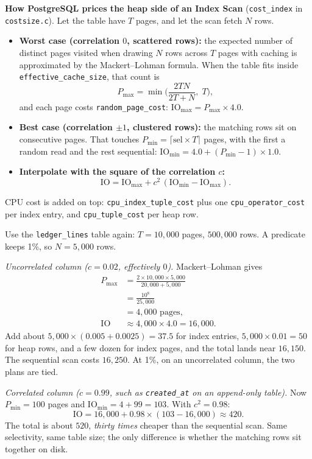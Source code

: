 \begin{formalbox}
\textbf{How PostgreSQL prices the heap side of an Index Scan} (\texttt{cost\_index} in \texttt{costsize.c}). Let the table have $T$ pages, and let the scan fetch $N$ rows.
\begin{itemize}
  \item \textbf{Worst case (correlation $0$, scattered rows):} the expected number of distinct pages visited when drawing $N$ rows across $T$ pages with caching is approximated by the Mackert--Lohman formula. When the table fits inside \texttt{effective\_cache\_size}, that count is
  \[
    P_{\max} = \min\!\Big(\frac{2TN}{2T + N},\; T\Big),
  \]
  and each page costs \texttt{random\_page\_cost}: $\text{IO}_{\max} = P_{\max} \times 4.0$.
  \item \textbf{Best case (correlation $\pm 1$, clustered rows):} the matching rows sit on consecutive pages. That touches $P_{\min} = \lceil \text{sel} \times T \rceil$ pages, with the first a random read and the rest sequential: $\text{IO}_{\min} = 4.0 + (P_{\min} - 1) \times 1.0$.
  \item \textbf{Interpolate with the square of the correlation $c$:}
  \[
    \text{IO} = \text{IO}_{\max} + c^2\,(\text{IO}_{\min} - \text{IO}_{\max}).
  \]
\end{itemize}
CPU cost is added on top: \texttt{cpu\_index\_tuple\_cost} plus one \texttt{cpu\_operator\_cost} per index entry, and \texttt{cpu\_tuple\_cost} per heap row.
\end{formalbox}

\begin{example}
\label{ch07:ex-index-corr}
Use the \texttt{ledger\_lines} table again: $T = 10{,}000$ pages, $500{,}000$ rows. A predicate keeps 1\%, so $N = 5{,}000$ rows.

\emph{Uncorrelated column ($c = 0.02$, effectively $0$).} Mackert--Lohman gives
\begin{align*}
  P_{\max} &= \frac{2 \times 10{,}000 \times 5{,}000}{20{,}000 + 5{,}000} \\
  &= \frac{10^8}{25{,}000} \\
  &= 4{,}000 \text{ pages}, \\[6pt]
  \text{IO} &\approx 4{,}000 \times 4.0 = 16{,}000.
\end{align*}
Add about $5{,}000 \times (0.005 + 0.0025) = 37.5$ for index entries, $5{,}000 \times 0.01 = 50$ for heap rows, and a few dozen for index pages, and the total lands near $16{,}150$. The sequential scan costs $16{,}250$. At 1\%, on an uncorrelated column, the two plans are tied.

\emph{Correlated column ($c = 0.99$, such as \texttt{created\_at} on an append-only table).} Now $P_{\min} = 100$ pages and $\text{IO}_{\min} = 4 + 99 = 103$. With $c^2 = 0.98$:
\[
  \text{IO} = 16{,}000 + 0.98 \times (103 - 16{,}000) \approx 420.
\]
The total is about $520$, \emph{thirty times} cheaper than the sequential scan. Same selectivity, same table size; the only difference is whether the matching rows sit together on disk.
\end{example}


